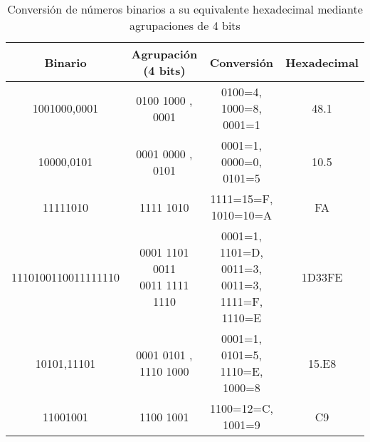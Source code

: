 \documentclass[12pt]{article}
\begin{document}
\begin{table}[H]
	\centering
	\renewcommand{\arraystretch}{1.3}
	\begin{tabular}{|c|c|c|c|}
		\hline
		\textbf{Binario} & \textbf{Agrupación (4 bits)} & \textbf{Conversión} & \textbf{Hexadecimal} \\
		\hline
		1001000,0001 & 0100 1000 , 0001 & 0100=4, 1000=8, 0001=1 & 48.1 \\
		\hline
		10000,0101 & 0001 0000 , 0101 & 0001=1, 0000=0, 0101=5 & 10.5 \\
		\hline
		11111010 & 1111 1010 & 1111=15=F, 1010=10=A & FA \\
		\hline
		1110100110011111110 & \makecell[l]{0001 1101 0011\\ 0011 1111 1110} & 
		\makecell[l]{0001=1, 1101=D, 0011=3,\\ 0011=3, 1111=F, 1110=E} & 
		1D33FE \\
		\hline
		10101,11101 & \makecell[l]{0001 0101 ,\\ 1110 1000} & 0001=1, 0101=5, 1110=E, 1000=8 & 15.E8 \\
		\hline
		11001001 & 1100 1001 & 1100=12=C, 1001=9 & C9 \\
		\hline
	\end{tabular}
	\caption{Conversión de números binarios a su equivalente hexadecimal mediante agrupaciones de 4 bits}
\end{table}
\end{document}
